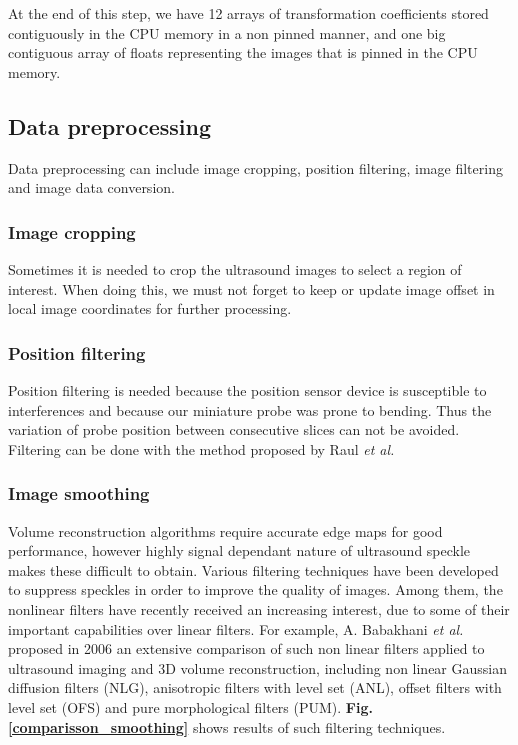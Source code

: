 \documentclass[12pt,journal,compsoc]{IEEEtran}
\begin{document}
At the end of this step, we have 12 arrays of transformation coefficients stored contiguously in the CPU memory in a non pinned manner, and one big contiguous array of floats representing the images that is pinned in the CPU memory. 

\subsection{Data preprocessing}

Data preprocessing can include image cropping, position filtering, image filtering and image data conversion.\par

\subsubsection{Image cropping}
Sometimes it is needed to crop the ultrasound images to select a region of interest. When doing this, we must not forget to keep or update image offset in local image coordinates for further processing. 

\subsubsection{Position filtering}
Position filtering is needed because the position sensor device is susceptible to interferences and because our miniature probe was prone to bending. Thus the variation of probe position between consecutive slices can not be avoided. Filtering can be done with the method proposed by Raul \textit{et al.}\cite{9}\par

\subsubsection{Image smoothing}
Volume reconstruction algorithms require accurate edge maps for good performance, however highly signal dependant nature of ultrasound speckle makes these difficult to obtain. Various filtering techniques have been developed to suppress speckles in order to improve the quality of images. 
Among them, the nonlinear filters have recently received an increasing interest, due to some of their important capabilities over linear filters. For example, A. Babakhani \textit{et al.}\cite{1} proposed in 2006 an extensive comparison of such non linear filters applied to ultrasound imaging and 3D volume reconstruction, including non linear Gaussian diffusion filters (NLG), anisotropic filters with level set (ANL), offset filters with level set (OFS) and pure morphological filters (PUM). \textbf{Fig.\ref{comparisson_smoothing}} shows results of such filtering techniques.\par
\end{document}
